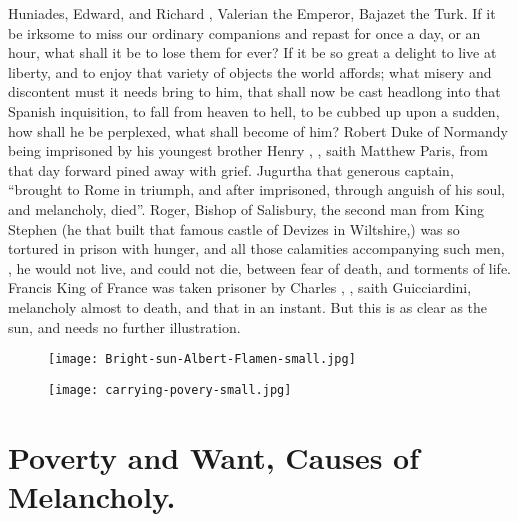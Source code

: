 Huniades, Edward, and Richard , Valerian the Emperor, Bajazet the Turk. If
it be irksome to miss our ordinary companions and repast for once a day, or an
hour, what shall it be to lose them for ever? If it be so great a delight to
live at liberty, and to enjoy that variety of objects the world affords; what
misery and discontent must it needs bring to him, that shall now be cast
headlong into that Spanish inquisition, to fall from heaven to hell, to be
cubbed up upon a sudden, how shall he be perplexed, what shall become of him?
Robert Duke of Normandy being imprisoned by his youngest
brother Henry , ,
saith Matthew Paris, from that day forward pined away with grief.
Jugurtha that generous captain, \enquote{brought to Rome in
triumph, and after imprisoned, through anguish of his soul, and melancholy,
died}. Roger, Bishop of Salisbury, the second man from
King Stephen (he that built that famous castle of Devizes
in Wiltshire,) was so tortured in prison with hunger, and all those calamities
accompanying such men, , he would not live, and could not die, between fear of death, and
torments of life. Francis King of France was taken prisoner by Charles ,
, saith Guicciardini, melancholy almost to
death, and that in an instant. But this is as clear as the sun, and needs no
further illustration.


\begin{figure}[H]
  \begingroup
  \centering
  \texttt{[image: Bright-sun-Albert-Flamen-small.jpg]}
  \label{fig:brightsun}
\end{figure}

\cleartoleftpage{}
\begin{figure}[p]
  \begingroup
  \centering
  \texttt{[image: carrying-povery-small.jpg]}
  \label{fig:povertyriches}
\end{figure}

\clearpage{}
\thispagestyle{titleontop}
\section{Poverty and Want, Causes of Melancholy.}\label{sec:poverty-and-want}

